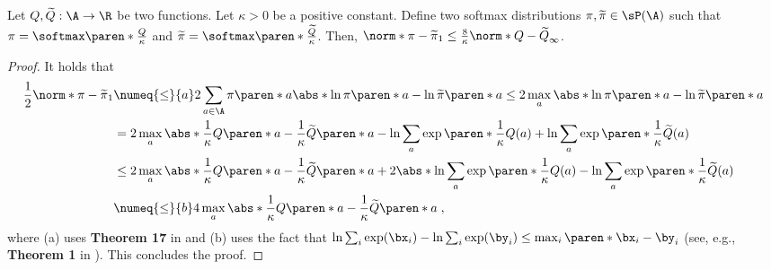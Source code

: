 \begin{lemma}\label{lemma:softmax-policy-bound}
Let $Q, \widetilde{Q} : \A \to \R$ be two functions.
Let $\kappa > 0$ be a positive constant.
Define two softmax distributions $\pi, \widetilde{\pi} \in \sP(\A)$ such that
\(
\pi = \softmax\paren*{\frac{Q}{\kappa}} 
\) and 
\(
\widetilde{\pi} = \softmax\paren*{\frac{\widetilde{Q}}{\kappa}}
\).
Then, 
\(
\norm*{\pi - \widetilde{\pi}}_1 \leq 
\frac{8}{\kappa}
\norm*{Q -\widetilde{Q}}_\infty
\).
\end{lemma}
\begin{proof}
It holds that
\begin{align*}
\frac{1}{2}\norm*{\pi - \widetilde{\pi}}_{1}
&\numeq{\leq}{a} 2\sum_{a \in \A} \pi\paren*{a} \abs*{\ln \pi\paren*{a} - \ln \widetilde{\pi}\paren*{a}}
\leq 2\max_a \abs*{\ln \pi\paren*{a} - \ln \widetilde{\pi}\paren*{a}}\\
&= 2\max_a \abs*{\frac{1}{\kappa} Q\paren*{a} - \frac{1}{\kappa}\widetilde{Q}\paren*{a} - \ln \sum_{a}\exp\paren*{\frac{1}{\kappa}Q(a)} + \ln \sum_{a}\exp\paren*{\frac{1}{\kappa}\widetilde{Q}(a)}}\\
&\leq 
2\max_a \abs*{\frac{1}{\kappa} Q\paren*{a} - \frac{1}{\kappa}\widetilde{Q}\paren*{a}}+ 2\abs*{\ln \sum_{a}\exp\paren*{\frac{1}{\kappa}Q(a)} - \ln \sum_{a}\exp\paren*{\frac{1}{\kappa}\widetilde{Q}(a)}}\\
&\numeq{\leq}{b} 4\max_a \abs*{\frac{1}{\kappa} Q\paren*{a} - \frac{1}{\kappa}\widetilde{Q}\paren*{a}}\;,
\end{align*}
where (a) uses \textbf{Theorem 17} in \citet{sason2016f} and (b) uses the fact that $\ln \sum_i \exp(\bx_i) - \ln \sum_i \exp(\by_i) \leq \max_i \paren*{\bx_i - \by_i}$ (see, e.g., \textbf{Theorem 1} in \citet{dutta2024log}).
This concludes the proof.
\end{proof}
